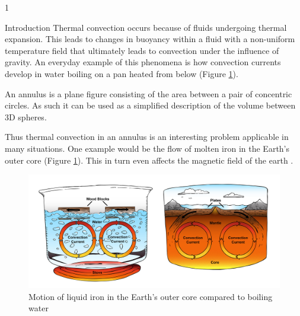 \documentclass[final]{beamer}
\newlength{\onecolwid}
\begin{document}
\begin{frame}[t]
\begin{columns}[t]
\begin{column}{1\onecolwid}
\begin{block}{Introduction}
Thermal convection occurs because of fluids undergoing thermal expansion. This leads to changes in buoyancy within a fluid with a non-uniform temperature field that ultimately leads to convection under the influence of gravity. An everyday example of this phenomena is how convection currents develop in water boiling on a pan heated from below (Figure \ref{fig:convection}).

 An annulus is a plane figure consisting of the area between a pair of concentric circles. As such it can be used as a simplified description of the volume between 3D spheres. 
 
Thus thermal convection in an annulus is an interesting problem applicable in many situations. One example would be the flow of molten iron in the Earth's outer core (Figure \ref{fig:convection}). This in turn even affects the magnetic field of the earth \cite{MoltenCore}.

\end{block}


\begin{figure}
\includegraphics[width= 1.1\linewidth]{fig_waterBoiling.jpg}
\caption{Motion of liquid iron in the Earth's outer core compared to boiling water \cite{ConvectionImage}}
\label{fig:convection}
\end{figure}




\end{column}
\end{columns}
\end{frame}
\end{document}
